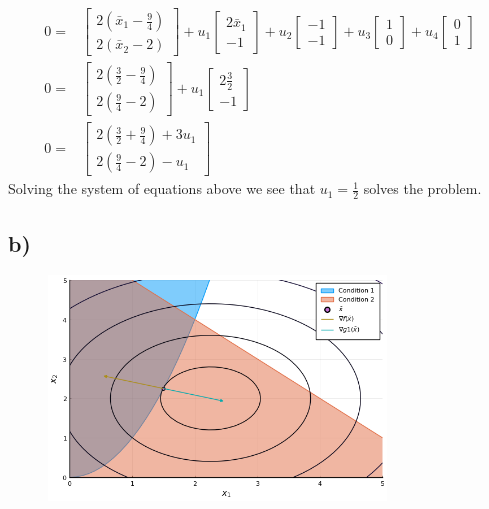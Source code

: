 \documentclass{article}
\begin{document}
	\begin{align}
		0 = & \begin{bmatrix} 2(\bar{x}_1 -\frac{9}{4}) \\ 2(\bar{x}_2 -2)\end{bmatrix} + u_1 \begin{bmatrix} 2\bar{x}_1 \\ -1 \end{bmatrix} + u_2 \begin{bmatrix} -1 \\ -1 \end{bmatrix} + u_3 \begin{bmatrix} 1 \\ 0 \end{bmatrix} + u_4 \begin{bmatrix} 0 \\ 1 \end{bmatrix}\\
		0 = & \begin{bmatrix} 2(\frac{3}{2} -\frac{9}{4}) \\ 2(\frac{9}{4} -2)\end{bmatrix} + u_1 \begin{bmatrix} 2\frac{3}{2} \\ -1 \end{bmatrix} \\
		0 = & \begin{bmatrix}2(\frac{3}{2} +\frac{9}{4}) +3u_1 \\ 2(\frac{9}{4} -2) -u_1
		\end{bmatrix}
	\end{align}
	Solving the system of equations above we see that $u_1 = \frac{1}{2}$ solves the problem.
\subsection*{b)}
	\begin{figure}[H]
		\includegraphics[width=0.8\textwidth]{3_2.png}
		\caption{}
		\label{fig:2a}
	\end{figure}
\end{document}
